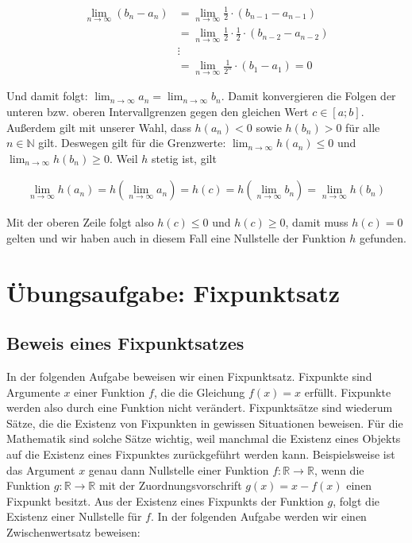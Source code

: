 \documentclass[fontsize=9pt,
               parskip=half-,
               DIV=14,
               listof=chapterentry,
               tocflat]{scrbook}
\begin{document}
\begin{proof*}
\begin{align*}
\lim _{n\rightarrow \infty }{(b_{n}-a_{n})}&=\lim _{n\rightarrow \infty }{{\frac {1}{2}}\cdot (b_{n-1}-a_{n-1})}\\[0.3em]&=\lim _{n\rightarrow \infty }{{\frac {1}{2}}\cdot {\frac {1}{2}}\cdot (b_{n-2}-a_{n-2})}\\[0.3em]&\vdots \\[0.3em]&=\lim _{n\rightarrow \infty }{{\frac {1}{2^{n}}}\cdot (b_{1}-a_{1})}=0
\end{align*}

Und damit folgt: $\lim _{n\rightarrow \infty }{a_{n}}=\lim _{n\rightarrow \infty }{b_{n}}$. Damit konvergieren die Folgen der unteren bzw. oberen Intervallgrenzen gegen den gleichen Wert $c\in [a;b]$. Außerdem gilt mit unserer Wahl, dass $h(a_{n})<0$ sowie $h(b_{n})>0$ für alle $n\in \mathbb {N} $ gilt. Deswegen gilt für die Grenzwerte: $\lim _{n\rightarrow \infty }{h(a_{n})}\leq 0$ und $\lim _{n\rightarrow \infty }{h(b_{n})}\geq 0$. Weil $h$ stetig ist, gilt

\begin{align*}
\lim _{n\rightarrow \infty }{h(a_{n})}=h\left(\lim _{n\rightarrow \infty }{a_{n}}\right)=h(c)=h\left(\lim _{n\rightarrow \infty }{b_{n}}\right)=\lim _{n\rightarrow \infty }{h(b_{n})}
\end{align*}

Mit der oberen Zeile folgt also $h(c)\leq 0$ und $h(c)\geq 0$, damit muss $h(c)=0$ gelten und wir haben auch in diesem Fall eine Nullstelle der Funktion $h$ gefunden.

\end{proof*}

\section{Übungsaufgabe: Fixpunktsatz}

\subsection{Beweis eines Fixpunktsatzes}

In der folgenden Aufgabe beweisen wir einen Fixpunktsatz. Fixpunkte sind Argumente $x$ einer Funktion $f$, die die Gleichung $f(x)=x$ erfüllt. Fixpunkte werden also durch eine Funktion nicht verändert. Fixpunktsätze sind wiederum Sätze, die die Existenz von Fixpunkten in gewissen Situationen beweisen. Für die Mathematik sind solche Sätze wichtig, weil manchmal die Existenz eines Objekts auf die Existenz eines Fixpunktes zurückgeführt werden kann. Beispielsweise ist das Argument $x$ genau dann Nullstelle einer Funktion $f:\mathbb {R} \to \mathbb {R} $, wenn die Funktion $g:\mathbb {R} \to \mathbb {R} $ mit der Zuordnungsvorschrift $g(x)=x-f(x)$ einen Fixpunkt besitzt. Aus der Existenz eines Fixpunkts der Funktion $g$, folgt die Existenz einer Nullstelle für $f$. In der folgenden Aufgabe werden wir einen Zwischenwertsatz beweisen:
\end{document}
